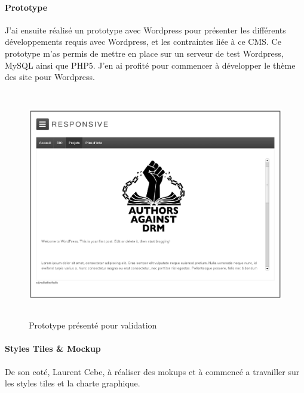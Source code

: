 \documentclass[11pt,a4paper]{report}
\begin{document}
			\paragraph*{Prototype}J'ai ensuite réalisé un prototype avec Wordpress pour présenter les différents développements requis avec Wordpress, et les contraintes liée à ce CMS. Ce prototype m'as permis de mettre en place sur un serveur de test Wordpress, MySQL ainsi que PHP5. J'en ai profité pour commencer à développer le thème des site pour Wordpress.

				\begin{figure}[H]
					\centering
					\includegraphics[height=10cm]{Prototype.eps}
					\caption{Prototype présenté pour validation}
					\label{fig:Prototype}
				\end{figure}

			\paragraph*{Styles Tiles \& Mockup}De son coté, Laurent Cebe, à réaliser des mokups et à commencé a travailler sur les styles tiles et la charte graphique.
\end{document}
